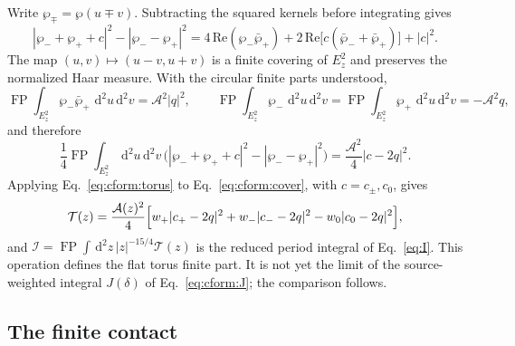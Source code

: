 \documentclass[11pt,a4paper]{article}
\numberwithin{equation}{section}
\newcommand{\dd}{\,\mathrm d}
\newcommand{\FP}{\operatorname{FP}}
\newcommand{\cI}{\mathcal I}
\begin{document}
Write $\wp_\mp=\wp(u\mp v)$. Subtracting the squared kernels before integrating gives
\begin{equation}
 |\wp_-+\wp_++c|^2-|\wp_--\wp_+|^2=4\,\mathrm{Re}(\wp_-\bar\wp_+)+2\,\mathrm{Re}\bigl[c(\bar\wp_-+\bar\wp_+)\bigr]+|c|^2.
\end{equation}
The map $(u,v)\mapsto(u-v,u+v)$ is a finite covering of $E_z^2$ and preserves the normalized Haar measure. With the
circular finite parts understood,
\begin{equation}
 \FP\!\int_{E_z^2}\wp_-\bar\wp_+\,\dd^2u\dd^2v=\mathcal A^2|q|^2,\qquad
 \FP\!\int_{E_z^2}\wp_-\,\dd^2u\dd^2v=\FP\!\int_{E_z^2}\wp_+\,\dd^2u\dd^2v=-\mathcal A^2q,
\end{equation}
and therefore
\begin{equation}
 \frac14\FP\!\int_{E_z^2}\dd^2u\dd^2v\,\bigl(|\wp_-+\wp_++c|^2-|\wp_--\wp_+|^2\bigr)=\frac{\mathcal A^2}{4}|c-2q|^2.
 \label{eq:cform:torus}
\end{equation}
Applying Eq.~\eqref{eq:cform:torus} to Eq.~\eqref{eq:cform:cover}, with $c=c_\pm,c_0$, gives
\begin{equation}
 \mathcal T(z)=\frac{\mathcal A(z)^2}{4}\Bigl[w_+|c_+-2q|^2+w_-|c_--2q|^2-w_0|c_0-2q|^2\Bigr],
\end{equation}
and $\cI=\FP\!\int\dd^2z\,|z|^{-15/4}\mathcal T(z)$ is the reduced period integral of Eq.~\eqref{eq:I}. This operation
defines the flat torus finite part. It is not yet the limit of the source-weighted integral $J(\delta)$ of
Eq.~\eqref{eq:cform:J}; the comparison follows.

\subsection{The finite contact}\label{app:cform:contact}
\end{document}
